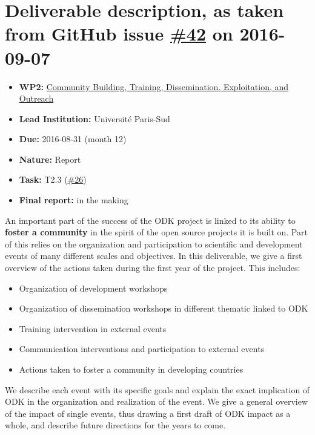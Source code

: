 \section*{\texorpdfstring{Deliverable description, as taken from GitHub
issue
\href{https://github.com/OpenDreamKit/OpenDreamKit/issues/42}{\#42} on
2016-09-07}{Deliverable description, as taken from GitHub issue \#42 on 2016-09-07}}\label{deliverable-description-as-taken-from-github-issues-42-on-2016-09-07}

\begin{itemize}
\tightlist
\item
  \textbf{WP2:}
  \href{https://github.com/OpenDreamKit/OpenDreamKit/tree/master/WP2}{Community
  Building, Training, Dissemination, Exploitation, and Outreach}
\item
  \textbf{Lead Institution:} Université Paris-Sud
\item
  \textbf{Due:} 2016-08-31 (month 12)
\item
  \textbf{Nature:} Report
\item
  \textbf{Task:} T2.3
  (\href{https://github.com/OpenDreamKit/OpenDreamKit/issues/26}{\#26})
\item
  \textbf{Final report:} in the making
\end{itemize}

An important part of the success of the ODK project is linked to its
ability to \textbf{foster a community} in the spirit of the open source
projects it is built on. Part of this relies on the organization and
participation to scientific and development events of many different
scales and objectives. In this deliverable, we give a first overview of
the actions taken during the first year of the project. This includes:

\begin{itemize}
\tightlist
\item
  Organization of development workshops
\item
  Organization of dissemination workshops in different thematic linked
  to ODK
\item
  Training intervention in external events
\item
  Communication interventions and participation to external events
\item
  Actions taken to foster a community in developing countries
\end{itemize}

We describe each event with its specific goals and explain the exact
implication of ODK in the organization and realization of the event. We
give a general overview of the impact of single events, thus drawing a
first draft of ODK impact as a whole, and describe future directions for
the years to come.

